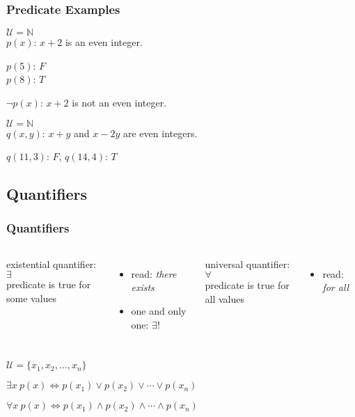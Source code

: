 \documentclass[dvipsnames]{beamer}
\begin{document}
\begin{frame}
  \frametitle{Predicate Examples}

  $\mathcal{U} = \mathbb{N}$\\
  $p(x)$: $x+2$ is an even integer.

  \smallskip
  $p(5)$: $F$\\
  $p(8)$: $T$

  \pause
  \bigskip
  $\neg p(x)$: $x+2$ is not an even integer.

  \pause
  \bigskip
  $\mathcal{U} = \mathbb{N}$\\
  $q(x,y)$: $x+y$ and $x-2y$ are even integers.

  \smallskip
  $q(11,3)$: $F$, $q(14,4)$: $T$
\end{frame}

\subsection{Quantifiers}

\begin{frame}
  \frametitle{Quantifiers}

  \begin{columns}[t]
    \begin{definition}
      \alert{existential quantifier}:  $\exists$\\
        predicate is true for some values
    \end{definition}

    \begin{itemize}
      \item read: \emph{there exists}

      \pause
      \item one and only one: $\exists!$
    \end{itemize}

    \pause
    \begin{definition}
      \alert{universal quantifier}: $\forall$\\
        predicate is true for all values
    \end{definition}

    \begin{itemize}
      \item read: \emph{for all}
    \end{itemize}
  \end{columns}

  \pause
  \bigskip
  \begin{center}
  $\mathcal{U} = \{x_1,x_2,\ldots,x_n\}$

  $\exists x~p(x) \Leftrightarrow p(x_1) \vee p(x_2) \vee \cdots \vee p(x_n)$

  $\forall x~p(x) \Leftrightarrow p(x_1) \wedge p(x_2) \wedge \cdots \wedge p(x_n)$
  \end{center}
\end{frame}
\end{document}
